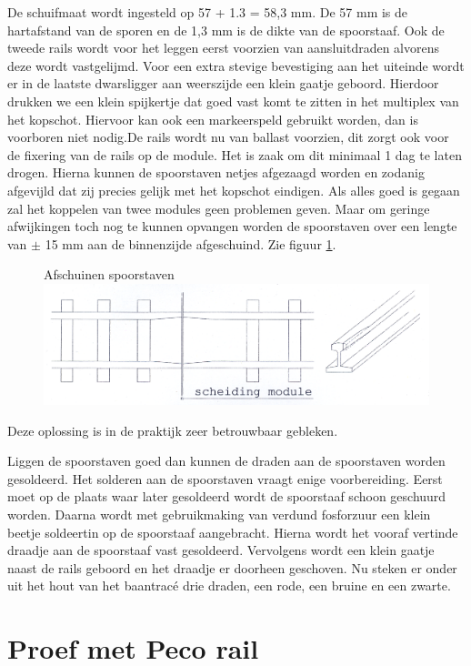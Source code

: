 \documentclass[12pt,a4paper]{report}
\newcommand*{\trace}{trac\'{e} }
\begin{document}
De schuifmaat wordt ingesteld op 57 + 1.3 = 58,3 mm. De 57 mm is de hartafstand van de sporen en de 1,3 mm is de dikte van de spoorstaaf.
Ook de tweede rails wordt voor het leggen eerst voorzien van aansluitdraden alvorens deze wordt vastgelijmd.
Voor een extra stevige bevestiging aan het uiteinde wordt er in de laatste dwarsligger aan weerszijde een klein gaatje geboord. Hierdoor drukken we een klein spijkertje dat goed vast komt te zitten in het multiplex van het kopschot. Hiervoor kan ook een markeerspeld gebruikt worden, dan is voorboren niet nodig.De rails wordt nu van ballast voorzien, dit zorgt ook voor de fixering van de rails op de module. Het is zaak om dit minimaal 1 dag te laten drogen.
Hierna kunnen de spoorstaven netjes afgezaagd worden en zodanig afgevijld dat zij precies gelijk met het kopschot eindigen. Als alles goed is gegaan zal het koppelen van twee modules geen problemen geven. Maar om geringe afwijkingen toch nog te kunnen opvangen worden de spoorstaven over een lengte van $\pm$ 15 mm aan de binnenzijde afgeschuind. Zie figuur \ref{figuur6}.

\begin{figure}[!ht]
  \captionbox
  {Afschuinen spoorstaven\label{figuur6}}
  {\includegraphics[scale=1.0]{images/rcu_figuur6}}
\end{figure}

Deze oplossing is in de praktijk zeer betrouwbaar gebleken.

Liggen de spoorstaven goed dan kunnen de draden aan de spoorstaven worden gesoldeerd. Het solderen aan de spoorstaven vraagt enige voorbereiding. Eerst moet op de plaats waar later gesoldeerd wordt de spoorstaaf schoon geschuurd worden. Daarna wordt met gebruikmaking van verdund fosforzuur een klein beetje soldeertin op de spoorstaaf aangebracht. Hierna wordt het vooraf vertinde draadje aan de spoorstaaf vast gesoldeerd. Vervolgens wordt een klein gaatje naast de rails geboord en het draadje er doorheen geschoven. Nu steken er onder uit het hout van het baan\trace drie draden, een rode, een bruine en een zwarte.

\section{Proef met Peco rail}
\end{document}
